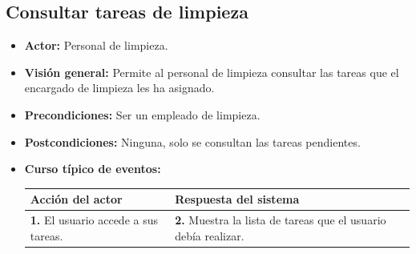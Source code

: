 \documentclass[spanish,a4paper,11pt, twoside]{report}	%
\begin{document}

	\hspace{1 true cm}
	\subsection{Consultar tareas de limpieza}				
			\begin{itemize}
				\item \textbf{Actor:} Personal de limpieza.
				\item \textbf{Visión general:} Permite al personal de limpieza consultar las
					tareas que el encargado de limpieza les ha asignado.
			\item \textbf{Precondiciones:} Ser un empleado de limpieza.
			\item \textbf{Postcondiciones:}  Ninguna, solo se consultan las tareas pendientes.
			\item \textbf{Curso típico de eventos:}\\ 
				\begin{tabular}{|p{6cm}||p{6cm}|}
					\hline
					\textbf{Acción del actor} & \textbf{Respuesta del sistema} \\ \hline \hline
					\textbf{1.} El usuario accede a sus tareas. & 
					\textbf{2.} Muestra la lista de tareas que el usuario debía realizar.\\ \hline 
				\end{tabular}
			\end {itemize}


	
\end{document}
